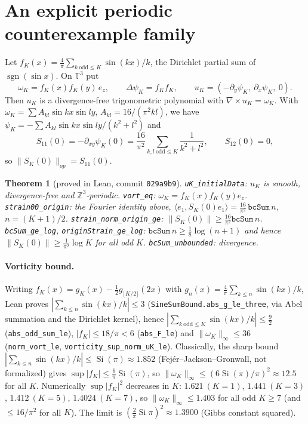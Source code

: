\documentclass[11pt]{article}
\newtheorem{theorem}{Theorem}\newtheorem{proposition}{Proposition}
\theoremstyle{definition}\newtheorem{definition}{Definition}
\begin{document}
\section{An explicit periodic counterexample family}
Let $f_K(x)=\tfrac4\pi\sum_{k\ \mathrm{odd}\le K}\sin(kx)/k$, the Dirichlet partial sum of $\operatorname{sgn}(\sin x)$. On $\mathbb{T}^3$ put
\[
\omega_K=f_K(x)f_K(y)\,e_z,\qquad \Delta\psi_K=f_Kf_K,\qquad u_K=(-\partial_y\psi_K,\ \partial_x\psi_K,\ 0).
\]
Then $u_K$ is a divergence-free trigonometric polynomial with $\nabla\times u_K=\omega_K$. With $\omega_K=\sum A_{kl}\sin kx\sin ly$, $A_{kl}=16/(\pi^2kl)$, we have $\psi_K=-\sum A_{kl}\sin kx\sin ly/(k^2+l^2)$ and
\[
S_{11}(0)=-\partial_{xy}\psi_K(0)=\frac{16}{\pi^2}\sum_{k,l\ \mathrm{odd}\le K}\frac1{k^2+l^2},\qquad S_{12}(0)=0,
\]
so $\|S_K(0)\|_{op}=S_{11}(0)$.
\begin{theorem}[proved in Lean, commit \texttt{029a9b9}]
\texttt{uK\_initialData}: $u_K$ is smooth, divergence-free and $\mathbb{Z}^3$-periodic. \texttt{vort\_eq}: $\omega_K=f_K(x)f_K(y)e_z$. \texttt{strain00\_origin}: the Fourier identity above, $\langle e_1,S_K(0)e_1\rangle=\tfrac{16}{\pi^2}\,\texttt{bcSum}\,n$, $n=(K+1)/2$. \texttt{strain\_norm\_origin\_ge}: $\|S_K(0)\|\ge\tfrac{16}{\pi^2}\texttt{bcSum}\,n$. \texttt{bcSum\_ge\_log}, \texttt{originStrain\_ge\_log}: $\texttt{bcSum}\,n\ge\tfrac18\log(n+1)$ and hence $\|S_K(0)\|\ge\tfrac1{\pi^2}\log K$ for all odd $K$. \texttt{bcSum\_unbounded}: divergence.
\end{theorem}
\paragraph{Vorticity bound.} Writing $f_K(x)=g_K(x)-\tfrac12g_{\lfloor K/2\rfloor}(2x)$ with $g_n(x)=\tfrac4\pi\sum_{k\le n}\sin(kx)/k$, Lean proves $|\sum_{k\le n}\sin(kx)/k|\le3$ (\texttt{SineSumBound.abs\_g\_le\_three}, via Abel summation and the Dirichlet kernel), hence $|\sum_{k\ \mathrm{odd}\le K}\sin(kx)/k|\le\tfrac92$ (\texttt{abs\_odd\_sum\_le}), $|f_K|\le18/\pi<6$ (\texttt{abs\_F\_le}) and $\|\omega_K\|_\infty\le36$ (\texttt{norm\_vort\_le}, \texttt{vorticity\_sup\_norm\_uK\_le}). Classically, the sharp bound $|\sum_{k\le n}\sin(kx)/k|\le\operatorname{Si}(\pi)\approx1.852$ (Fej\'er--Jackson--Gronwall, not formalized) gives $\sup|f_K|\le\tfrac6\pi\operatorname{Si}(\pi)$, so $\|\omega_K\|_\infty\le(6\operatorname{Si}(\pi)/\pi)^2\approx12.5$ for all $K$. Numerically $\sup|f_K|^2$ decreases in $K$: $1.621\ (K=1)$, $1.441\ (K=3)$, $1.412\ (K=5)$, $1.4024\ (K=7)$, so $\|\omega_K\|_\infty\le1.403$ for all odd $K\ge7$ (and $\le16/\pi^2$ for all $K$). The limit is $(\tfrac2\pi\operatorname{Si}\pi)^2\approx1.3900$ (Gibbs constant squared).
\end{document}
